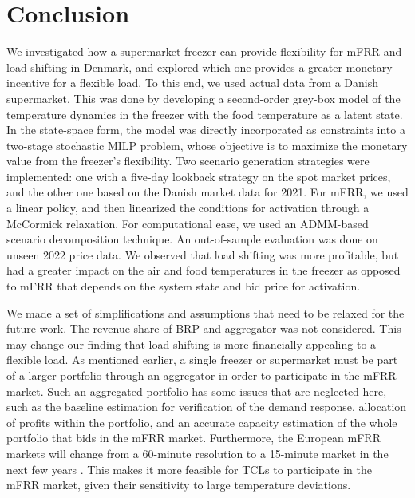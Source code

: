 \section{Conclusion}\label{sec:conclusion}

We investigated how a supermarket freezer can provide flexibility for mFRR and load shifting in Denmark, and explored which one provides a greater monetary incentive for a flexible load. To this end, we used actual data  from a Danish supermarket. This was done by developing a second-order grey-box model of the temperature dynamics in the freezer with the food temperature as a latent state. In the state-space form, the model was directly incorporated as constraints into a two-stage stochastic MILP problem, whose objective is to maximize the monetary value from the freezer's flexibility. Two scenario generation strategies were implemented: one with a five-day lookback strategy on the spot market prices, and the other one  based on the Danish market data for 2021. For mFRR, we used a linear policy, and then linearized the conditions for activation through  a McCormick relaxation. For computational ease, we used an ADMM-based scenario decomposition technique.  An out-of-sample evaluation was done on unseen 2022 price data. We observed that load shifting was more profitable, but had a greater impact on the air and food temperatures in the freezer as opposed to mFRR that depends on the system state and bid price for activation. 

We made a set of simplifications and assumptions that need to be relaxed for the future work. The revenue share of BRP and aggregator was not considered. This may change our finding that load shifting is more financially appealing to a flexible load. As mentioned earlier, a single freezer or supermarket must be part of a larger portfolio through an aggregator in order to participate in the mFRR market. Such an aggregated portfolio has some issues that are neglected here, such as the baseline estimation for verification of the demand response, allocation of profits within the portfolio, and an accurate capacity estimation of the whole portfolio that bids in the mFRR market. Furthermore, the European mFRR markets will change from a 60-minute resolution to a 15-minute market in the next few years \cite{MARI}. This makes it more feasible for TCLs to participate in the mFRR market, given their sensitivity to large temperature deviations.